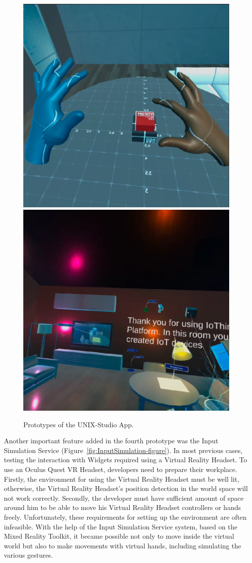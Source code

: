 \begin{figure}
  \centering
    {\includegraphics[width=0.435\linewidth]{figures/Prototype3.png}}
    {\includegraphics[width=0.44\linewidth]{figures/Prototype4.png}}
  \caption{Prototypes of the UNIX-Studio App.}
  \label{fig:NUIXStudioPrototypes-figure}
\end{figure}

Another important feature added in the fourth prototype was the Input Simulation Service (Figure~\ref{fig:InputSimulation-figure}). In most previous cases, testing the interaction with Widgets required using a Virtual Reality Headset. To use an Oculus Quest VR Headset, developers need to prepare their workplace. Firstly, the environment for using the Virtual Reality Headset must be well lit, otherwise, the Virtual Reality Headset's position detection in the world space will not work correctly. Secondly, the developer must have sufficient amount of space around him to be able to move his Virtual Reality Headset controllers or hands freely. Unfortunately, these requirements for setting up the environment are often infeasible. With the help of the Input Simulation Service system, based on the Mixed Reality Toolkit, it became possible not only to move inside the virtual world but also to make movements with virtual hands, including simulating the various gestures.

